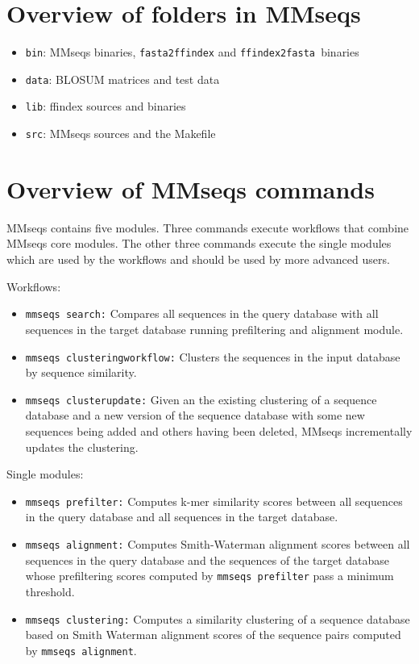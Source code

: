\documentclass[11pt,a4paper]{report}
\begin{document}
\section{Overview of folders in MMseqs}
\begin{itemize}
\item \texttt{bin}: MMseqs binaries, \texttt{fasta2ffindex} and \texttt{ffindex2fasta
}binaries
\item \texttt{data}: BLOSUM matrices and test data
\item \texttt{lib}: ffindex sources and binaries
\item \texttt{src}: MMseqs sources and the Makefile
\end{itemize}

\section{Overview of MMseqs commands}

MMseqs contains five modules. Three commands execute workflows that
combine MMseqs core modules. The other three commands execute the
single modules which are used by the workflows and should be used
by more advanced users.

Workflows:
\begin{itemize}
\item \texttt{mmseqs search:} Compares all sequences in the query database
with all sequences in the target database running prefiltering and alignment module.
\item \texttt{mmseqs clusteringworkflow:} Clusters the sequences in the input database
by sequence similarity.
\item \texttt{mmseqs clusterupdate:} Given an the existing clustering of a sequence
database and a new version of the sequence database with some new
sequences being added and others having been deleted, MMseqs incrementally
updates the clustering.
\end{itemize}
Single modules:
\begin{itemize}
\item \texttt{mmseqs prefilter:} Computes k-mer similarity scores between all
sequences in the query database and all sequences in the target database.
\item \texttt{mmseqs alignment:} Computes Smith-Waterman alignment scores between
all sequences in the query database and the sequences of the target
database whose prefiltering scores computed by \texttt{mmseqs prefilter}
pass a minimum threshold.
\item \texttt{mmseqs clustering:} Computes a similarity clustering of a sequence
database based on Smith Waterman alignment scores of the sequence
pairs computed by \texttt{mmseqs alignment}.
\end{itemize}
\end{document}
